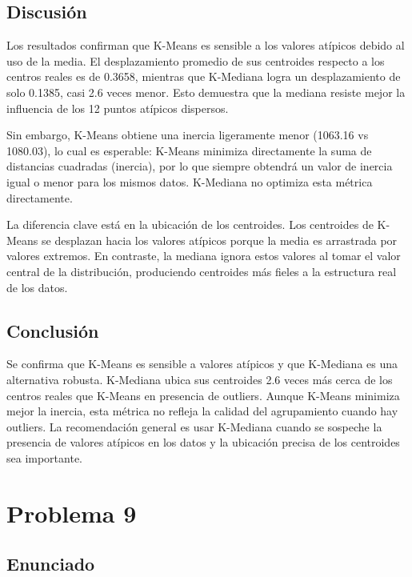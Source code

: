\documentclass{article}
\begin{document}
\subsection{Discusión}

Los resultados confirman que K-Means es sensible a los valores atípicos debido al uso de la media. El desplazamiento promedio de sus centroides respecto a los centros reales es de 0.3658, mientras que K-Mediana logra un desplazamiento de solo 0.1385, casi 2.6 veces menor. Esto demuestra que la mediana resiste mejor la influencia de los 12 puntos atípicos dispersos.

Sin embargo, K-Means obtiene una inercia ligeramente menor (1063.16 vs 1080.03), lo cual es esperable: K-Means minimiza directamente la suma de distancias cuadradas (inercia), por lo que siempre obtendrá un valor de inercia igual o menor para los mismos datos. K-Mediana no optimiza esta métrica directamente.

La diferencia clave está en la ubicación de los centroides. Los centroides de K-Means se desplazan hacia los valores atípicos porque la media es arrastrada por valores extremos. En contraste, la mediana ignora estos valores al tomar el valor central de la distribución, produciendo centroides más fieles a la estructura real de los datos.

\subsection{Conclusión}

Se confirma que K-Means es sensible a valores atípicos y que K-Mediana es una alternativa robusta. K-Mediana ubica sus centroides 2.6 veces más cerca de los centros reales que K-Means en presencia de outliers. Aunque K-Means minimiza mejor la inercia, esta métrica no refleja la calidad del agrupamiento cuando hay outliers. La recomendación general es usar K-Mediana cuando se sospeche la presencia de valores atípicos en los datos y la ubicación precisa de los centroides sea importante.


\section{Problema 9}

\subsection{Enunciado}
\end{document}
